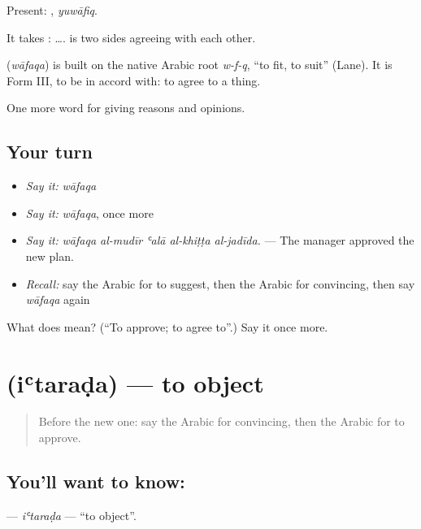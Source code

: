 Present: , \emph{yuwāfiq}.

It takes :   ….  is two sides agreeing with each other.

\begin{cousinweb}
\textbf{} (\emph{wāfaqa}) is built on the native Arabic root \emph{w-f-q}, \textquotedblleft{}to fit, to suit\textquotedblright{} (Lane). It is Form III, to be in accord with: to agree to a thing.
\end{cousinweb}

\begin{grammarlens}[title={What you've built}]
One more word for giving reasons and opinions.
\end{grammarlens}

\subsection*{Your turn}
\begin{itemize}
\raggedright
  \item \emph{Say it:} \emph{wāfaqa}
  \item \emph{Say it:} \emph{wāfaqa}, once more
  \item \emph{Say it:} \emph{wāfaqa al-mudīr ʿalā al-khiṭṭa al-jadīda.} — The manager approved the new plan.
  \item \emph{Recall:} say the Arabic for to suggest, then the Arabic for convincing, then say \emph{wāfaqa} again
\end{itemize}

\begin{tcolorbox}[breakable,colback=teal!4,colframe=teal!35!black,title={Before you move on}]
What does  mean? (\textquotedblleft{}To approve; to agree to\textquotedblright{}.) Say it once more.
\end{tcolorbox}
\section[\texorpdfstring{\ar{اعترض} (iʿtaraḍa)}{اعترض (iʿtaraḍa)}]{ (iʿtaraḍa) — to object}

\label{lesson:AR-C360-itarada}



\begin{quote}
Before the new one: say the Arabic for convincing, then the Arabic for to approve.
\end{quote}

\subsection*{You'll want to know: }
\textbf{} — \emph{iʿtaraḍa} — \textquotedblleft{}to object\textquotedblright{}.

